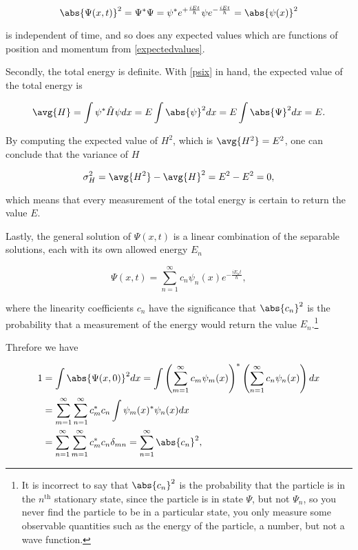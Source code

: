 \documentclass[a4paper,12pt]{report}
\begin{document}
\begin{equation}
  \abs{\Psi (x,t)}^2 = \Psi ^*\Psi = \psi ^* e^{+\frac{iEt}{\hbar } }\psi e^{-\frac{iEt}{\hbar } } = \abs{\psi (x)}^2
\end{equation}

is independent of time, and so does any expected values which are functions of position and momentum from \cref{expectedvalues}.

Secondly, the total energy is definite. With \cref{psix} in hand, the expected value of the total energy is 

\begin{equation}
  \avg{H} = \int \psi ^* \hat{H} \psi dx = E \int \abs{\psi }^2 dx = E \int \abs{\Psi }^2 dx = E.  
\end{equation}

By computing the expected value of \(H^2\), which is \(\avg{H^2} = E^2 \), one can conclude that the variance of \(H\)

\begin{equation}
  \sigma _{H}^2 = \avg{H^2} - \avg{H}^2 = E^2- E^2 = 0,
\end{equation}

which means that every measurement of the total energy is certain to return the value \(E\).

Lastly, the general solution of \(\Psi (x,t)\) is a linear combination of the separable solutions, each with its own allowed energy \(E_{n} \) 

\begin{equation}
  \Psi (x,t) = \sum_{n=1}^{\infty} c_{n}\psi _{n}(x) e^{-\frac{iE_{n}t}{\hbar }  }, \label{Psix} 
\end{equation}

where the linearity coefficients \(c_{n} \) have the significance that \(\abs{c_{n} }^2 \) is the probability that a measurement of the energy would return the value \(E_{n} \).\footnote{It is incorrect to say that \(\abs{c_{n} }^2\) is the probability that the particle is in the \(n^{\text{th}} \) stationary state, since the particle is in state \(\Psi \), but not \(\Psi _{n} \), so you never find the particle to be in a particular state, you only measure some observable quantities such as the energy of the particle, a number, but not a wave function.} 

Threfore we have 

\begin{equation}
  \begin{aligned}
    1 &= \int \abs{\Psi (x,0)}^2dx = \int \left( \sum_{m=1}^{\infty}c_{m}\psi _{m}(x)\right)^*\left( \sum_{n=1}^{\infty}c_{n}\psi _{n}(x)\right) dx \\ &= \sum_{m=1}^{\infty}\sum_{n=1}^{\infty}c_{m}^*c_{n}\int \psi _{m}(x)^*\psi _{n}(x)dx \\ &= \sum_{n=1}^{\infty}\sum_{m=1}^{\infty}c_{m}^*c_{n}\delta _{mn}= \sum_{n=1}^{\infty}\abs{c_{n} }^2,       
  \end{aligned}
\end{equation}
\end{document}

